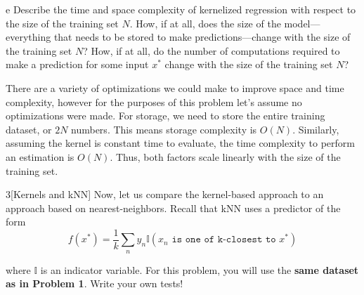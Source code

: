 \documentclass[expanded]{lkx_pset}
\begin{document}
\begin{parts}
  \begin{part}{e}
    Describe the time and space complexity of kernelized regression with respect to the size of the training set $N$. 
    How, if at all, does the size of the model---everything that needs to be stored to make predictions---change with the size of the training set $N$? 
    How, if at all, do the number of computations required to make a prediction for some input $x^*$ change with the size of the training set $N$?
  \end{part}

  There are a variety of optimizations we could make to improve space and time complexity, however for the purposes of this problem let's assume no optimizations were made. For storage, we need to store the entire training dataset, or $2N$ numbers. This means storage complexity is $O(N)$. Similarly, assuming the kernel is constant time to evaluate, the time complexity to perform an estimation is $O(N)$. Thus, both factors scale linearly with the size of the training set.
\end{parts}

\begin{problem}{3}[Kernels and kNN]
  Now, let us compare the kernel-based approach to an approach based on
  nearest-neighbors.  Recall that kNN uses a predictor of the form
  \begin{equation*}
    f(x^*) = \frac{1}{k} \sum_n y_n \mathbb{I}(x_n \texttt{ is one of k-closest to } x^*)
  \end{equation*}

  \noindent where $\mathbb{I}$ is an indicator variable. For this problem, you will use the \textbf{same dataset as in Problem 1}. Write your own tests!
\end{problem}
\end{document}
